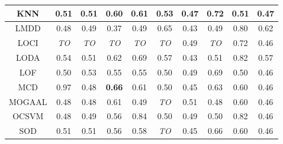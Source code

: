 \begin{table*}[!b]
\begin{tabular}{|c|c|c|c|c|c|c|c|c|c|}
\hline
                        KNN &                   0.51 &                        0.51 &                   0.60 &                         0.61 &                   0.53 &                        0.47 &                     0.72 &                  0.51 &                   0.47 \\
\hline
                        LMDD &                   0.48 &                        0.49 &                   0.37 &                         0.49 &                   0.65 &                        0.43 &                     0.49 &                  0.80 &                   0.62 \\
\hline
                        LOCI &            \textit{TO} &                 \textit{TO} &            \textit{TO} &                  \textit{TO} &            \textit{TO} &                        0.49 &              \textit{TO} &                  0.72 &                   0.46 \\
\hline
                        LODA &                   0.54 &                        0.51 &                   0.62 &                         0.69 &                   0.57 &                        0.43 &                     0.51 &                  0.82 &                   0.57 \\
\hline
                        LOF &                   0.50 &                        0.53 &                   0.55 &                         0.55 &                   0.50 &                        0.49 &                     0.69 &                  0.50 &                   0.46 \\
\hline
                        MCD &                   0.97 &                        0.48 &          \textbf{0.66} &                         0.61 &                   0.50 &                        0.45 &                     0.63 &                  0.60 &                   0.46 \\
\hline
                        MOGAAL &                   0.48 &                        0.48 &                   0.61 &                         0.49 &            \textit{TO} &                        0.51 &                     0.48 &                  0.60 &                   0.46 \\
\hline
                        OCSVM &                   0.48 &                        0.49 &                   0.56 &                         0.84 &                   0.50 &                        0.49 &                     0.50 &                  0.82 &                   0.46 \\
\hline
                        SOD &                   0.51 &                        0.51 &                   0.56 &                         0.58 &            \textit{TO} &                        0.45 &                     0.66 &                  0.60 &                   0.46 \\

\end{tabular}
\end{table*}

